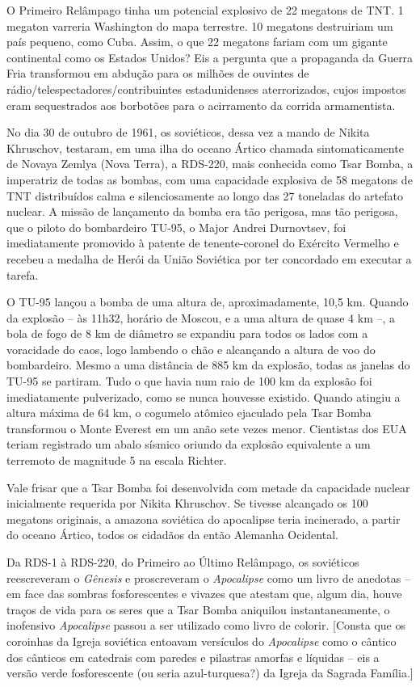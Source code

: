 O Primeiro Relâmpago tinha um potencial explosivo de 22 megatons de TNT.
1 megaton varreria Washington do mapa terrestre. 10 megatons destruiriam
um país pequeno, como Cuba. Assim, o que 22 megatons fariam com um
gigante continental como os Estados Unidos? Eis a pergunta que a
propaganda da Guerra Fria transformou em abdução para os milhões de
ouvintes de rádio/telespectadores/contribuintes estadunidenses
aterrorizados, cujos impostos eram sequestrados aos borbotões para o
acirramento da corrida armamentista.

No dia 30 de outubro de 1961, os soviéticos, dessa vez a mando de Nikita
Khruschov, testaram, em uma ilha do oceano Ártico chamada
sintomaticamente de Novaya Zemlya (Nova Terra), a RDS-220, mais
conhecida como Tsar Bomba, a imperatriz de todas as bombas, com uma
capacidade explosiva de 58 megatons de TNT distribuídos calma e
silenciosamente ao longo das 27 toneladas do artefato nuclear. A missão
de lançamento da bomba era tão perigosa, mas tão perigosa, que o piloto
do bombardeiro TU-95, o Major Andrei Durnovtsev, foi imediatamente
promovido à patente de tenente-coronel do Exército Vermelho e recebeu a
medalha de Herói da União Soviética por ter concordado em executar a
tarefa.

O TU-95 lançou a bomba de uma altura de, aproximadamente, 10,5 km.
Quando da explosão -- às 11h32, horário de Moscou, e a uma altura de
quase 4 km --, a bola de fogo de 8 km de diâmetro se expandiu para todos
os lados com a voracidade do caos, logo lambendo o chão e alcançando a
altura de voo do bombardeiro. Mesmo a uma distância de 885 km da
explosão, todas as janelas do TU-95 se partiram. Tudo o que havia num
raio de 100 km da explosão foi imediatamente pulverizado, como se nunca
houvesse existido. Quando atingiu a altura máxima de 64 km, o cogumelo
atômico ejaculado pela Tsar Bomba transformou o Monte Everest em um anão
sete vezes menor. Cientistas dos EUA teriam registrado um abalo sísmico
oriundo da explosão equivalente a um terremoto de magnitude 5 na escala
Richter.

Vale frisar que a Tsar Bomba foi desenvolvida com metade da capacidade
nuclear inicialmente requerida por Nikita Khruschov. Se tivesse
alcançado os 100 megatons originais, a amazona soviética do apocalipse
teria incinerado, a partir do oceano Ártico, todos os cidadãos da então
Alemanha Ocidental.

Da RDS-1 à RDS-220, do Primeiro ao Último Relâmpago, os soviéticos
reescreveram o \emph{Gênesis} e proscreveram o \emph{Apocalipse} como um
livro de anedotas -- em face das sombras fosforescentes e vivazes que
atestam que, algum dia, houve traços de vida para os seres que a Tsar
Bomba aniquilou instantaneamente, o inofensivo \emph{Apocalipse} passou
a ser utilizado como livro de colorir. {[}Consta que os coroinhas da
Igreja soviética entoavam versículos do \emph{Apocalipse} como o cântico
dos cânticos em catedrais com paredes e pilastras amorfas e líquidas --
eis a versão verde fosforescente (ou seria azul-turquesa?) da Igreja da
Sagrada Família.{]}

